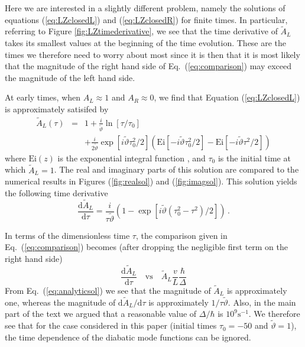 \documentclass[twocolumn,english,pra,aps,superscriptaddress,floatfix]{revtex4-1}
\begin{document}
Here we are interested in a slightly different problem, namely the solutions of equations (\ref{eq:LZclosedL}) and (\ref{eq:LZclosedR}) for finite times. In particular, referring to Figure \ref{fig:LZtimederivative}, we see that the time derivative of $\tilde{A}_{L}$ takes its smallest values at the beginning of the time evolution. These are the times we therefore need to worry about most since it is then that it is most likely that the magnitude of the right hand side of Eq.\ (\ref{eq:comparison}) may exceed the magnitude of the left hand side.

At early times, when $A_{L} \approx 1$ and $A_{R} \approx 0$, we find that Equation (\ref{eq:LZclosedL}) is approximately satisifed by 
\begin{eqnarray}
\tilde{A}_{L}(\tau) & = & 1  +  \frac{i}{\tilde{\vartheta}} \ln[\tau/\tau_{0}] \label{eq:analyticsol} \\ && + \frac{i}{2 \tilde{\vartheta}}  \exp [i \tilde{\vartheta}\tau_{0}^2/2] \left(  \mathrm{Ei}[-i \tilde{\vartheta}\tau_{0}^2/2]   -  \mathrm{Ei}[-i \tilde{\vartheta} \tau^2/2] \right)  \nonumber
\end{eqnarray}
where $\mathrm{Ei}(z)$ is the exponential  integral function \cite{a+s}, and $\tau_{0}$ is the initial time at which $\tilde{A}_{L}=1$. The real and imaginary parts of this solution are compared to the numerical results in Figures (\ref{fig:realsol}) and (\ref{fig:imagsol}). This solution yields the following time derivative
\begin{equation}
\frac{\mathrm{d}\tilde{A}_{L}}{\mathrm{d} \tau}=\frac{i}{\tau \tilde{\vartheta}} \left(1-\exp[i \tilde{\vartheta} (\tau_{0}^{2}-\tau^2)/2] \right) \, .
\end{equation}

In terms of the dimensionless time $\tau$, the comparison given in Eq.\ (\ref{eq:comparison}) becomes (after dropping the negligible first term on the right hand side)
\begin{equation}
\frac{\mathrm{d}\tilde{A}_{L}}{\mathrm{d} \tau} \quad \mbox{vs} \quad \tilde{A}_{L}\frac{v}{L} \frac{\hbar}{\Delta} 
\label{eq:comparison2}
\end{equation}
From Eq.\ (\ref{eq:analyticsol}) we see that the magnitude of $\tilde{A}_{L}$ is approximately one, whereas the magnitude of  $\mathrm{d} \tilde{A}_{L} / \mathrm{d}\tau$ is approximately $1/\tau \tilde{\vartheta}$. Also, in the main part of the text we argued that a reasonable value of $\Delta/\hbar$  is $10^{9}\mathrm{s}^{-1}$. We therefore see that for the case considered in this paper (initial times $\tau_{0}=-50$ and $\tilde{\vartheta}=1$), the time dependence of the diabatic mode functions can be ignored.
\end{document}
